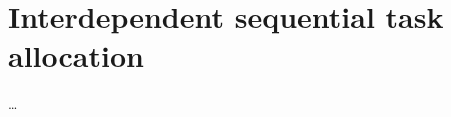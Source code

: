 \chapter{Interdependent sequential task allocation }                                  \label{ch:Interdependent sequential task allocation}

\ldots


\cleardoublepage

